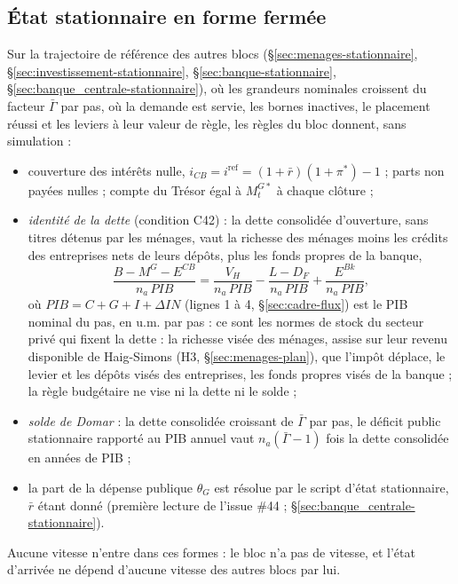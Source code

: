 \documentclass[11pt,a4paper]{article}
\begin{document}
\subsection{État stationnaire en forme fermée}
\label{sec:finances_publiques-stationnaire}
\begin{proposee}
Sur la trajectoire de référence des autres blocs (\S\ref{sec:menages-stationnaire}, \S\ref{sec:investissement-stationnaire}, \S\ref{sec:banque-stationnaire}, \S\ref{sec:banque_centrale-stationnaire}), où les grandeurs nominales croissent du facteur $\bar\Gamma$ par pas, où la demande est servie, les bornes inactives, le placement réussi et les leviers à leur valeur de règle, les règles du bloc donnent, sans simulation :
\begin{itemize}
\item couverture des intérêts nulle, $i_{\mathit{CB}} = i^{\mathrm{ref}} = (1 + \bar r)(1 + \pi^\ast) - 1$ ; parts non payées nulles ; compte du Trésor égal à $M^{G*}_t$ à chaque clôture ;
\item \emph{identité de la dette} (condition C42) : la dette consolidée d'ouverture, sans titres détenus par les ménages, vaut la richesse des ménages moins les crédits des entreprises nets de leurs dépôts, plus les fonds propres de la banque,
\begin{equation*}
\frac{B - M^G - E^{\mathit{CB}}}{n_a\,\mathit{PIB}} = \frac{V_H}{n_a\,\mathit{PIB}} - \frac{L - D_F}{n_a\,\mathit{PIB}} + \frac{E^{\mathit{Bk}}}{n_a\,\mathit{PIB}} ,
\end{equation*}
où $\mathit{PIB} = C + G + I + \Delta\mathit{IN}$ (lignes 1 à 4, \S\ref{sec:cadre-flux}) est le PIB nominal du pas, en u.m. par pas : ce sont les normes de stock du secteur privé qui fixent la dette : la richesse visée des ménages, assise sur leur revenu disponible de Haig-Simons (H3, \S\ref{sec:menages-plan}), que l'impôt déplace, le levier et les dépôts visés des entreprises, les fonds propres visés de la banque ; la règle budgétaire ne vise ni la dette ni le solde ;
\item \emph{solde de Domar} : la dette consolidée croissant de $\bar\Gamma$ par pas, le déficit public stationnaire rapporté au PIB annuel vaut $n_a(\bar\Gamma - 1)$ fois la dette consolidée en années de PIB ;
\item la part de la dépense publique $\theta_G$ est résolue par le script d'état stationnaire, $\bar r$ étant donné (première lecture de l'issue \#44 ; \S\ref{sec:banque_centrale-stationnaire}).
\end{itemize}
Aucune vitesse n'entre dans ces formes : le bloc n'a pas de vitesse, et l'état d'arrivée ne dépend d'aucune vitesse des autres blocs par lui.


\end{proposee}
\end{document}
